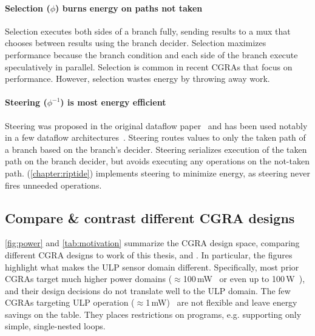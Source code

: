 \paragraph{Selection ($\phi$) burns energy on paths not taken}
Selection executes both sides of a branch fully, sending results to a mux that
chooses between results using the branch decider.
%
Selection maximizes performance because the branch condition and each side of the branch execute speculatively in parallel.
%
Selection is common in recent CGRAs that focus on performance.
% 
However, selection wastes energy by throwing away work.

\paragraph{Steering ($\phi^{-1}$) is most energy efficient}
%
Steering was proposed in the original dataflow paper~\cite{dennis1975preliminary}
and has been used notably in a few dataflow architectures~\cite{swanson2003wavescalar,dataflow-a-complement,mishra2006tartan,beret,seed}.
% 
Steering routes values to only the taken path of a branch based on the branch's
decider.
%
Steering serializes execution of the taken path on the branch decider, but
avoids executing any operations on the not-taken path.
%
\riptide (\autoref{chapter:riptide}) implements steering to minimize energy,
as steering never fires unneeded operations. 

\figPower
\tabMotivate
\subsection{Compare \& contrast different CGRA designs}
\autoref{fig:power} and \autoref{tab:motivation} summarize the CGRA design space, comparing different CGRA designs to work of this thesis, \snafu and \riptide.
% 
In particular, the figures highlight what makes the ULP sensor domain different.
% 
Specifically, most prior CGRAs target much higher power domains ($\approx$100\,mW~\cite{weng2020dsagen,karunaratne2017hycube,nowatzki:isca17:stream-dataflow,tan2018stitch,weng2020hybrid} or even up to 100\,W~\cite{plasticine,voitsechov2014single}),
and their design decisions do not translate well to the ULP domain.
%
The few CGRAs targeting ULP operation ($\approx$1\,mW)~\cite{ipa,cma,srp} are not flexible and leave energy savings on the table. 
% 
They places restrictions on programs, e.g. supporting only simple, single-nested loops.

